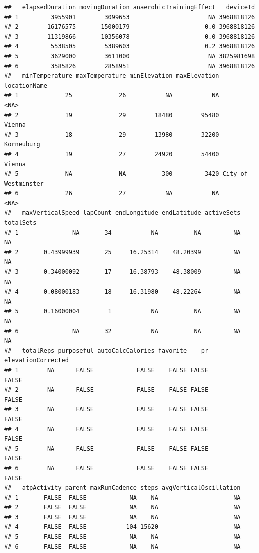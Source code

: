 \documentclass[
]{book}
\begin{document}
\begin{verbatim}
##   elapsedDuration movingDuration anaerobicTrainingEffect   deviceId
## 1         3955901        3099653                      NA 3968818126
## 2        16176575       15000179                     0.0 3968818126
## 3        11319866       10356078                     0.0 3968818126
## 4         5538505        5389603                     0.2 3968818126
## 5         3629000        3611000                      NA 3825981698
## 6         3585826        2858951                      NA 3968818126
##   minTemperature maxTemperature minElevation maxElevation        locationName
## 1             25             26           NA           NA                <NA>
## 2             19             29        18480        95480              Vienna
## 3             18             29        13980        32200          Korneuburg
## 4             19             27        24920        54400              Vienna
## 5             NA             NA          300         3420 City of Westminster
## 6             26             27           NA           NA                <NA>
##   maxVerticalSpeed lapCount endLongitude endLatitude activeSets totalSets
## 1               NA       34           NA          NA         NA        NA
## 2       0.43999939       25     16.25314    48.20399         NA        NA
## 3       0.34000092       17     16.38793    48.38009         NA        NA
## 4       0.08000183       18     16.31980    48.22264         NA        NA
## 5       0.16000004        1           NA          NA         NA        NA
## 6               NA       32           NA          NA         NA        NA
##   totalReps purposeful autoCalcCalories favorite    pr elevationCorrected
## 1        NA      FALSE            FALSE    FALSE FALSE              FALSE
## 2        NA      FALSE            FALSE    FALSE FALSE              FALSE
## 3        NA      FALSE            FALSE    FALSE FALSE              FALSE
## 4        NA      FALSE            FALSE    FALSE FALSE              FALSE
## 5        NA      FALSE            FALSE    FALSE FALSE              FALSE
## 6        NA      FALSE            FALSE    FALSE FALSE              FALSE
##   atpActivity parent maxRunCadence steps avgVerticalOscillation
## 1       FALSE  FALSE            NA    NA                     NA
## 2       FALSE  FALSE            NA    NA                     NA
## 3       FALSE  FALSE            NA    NA                     NA
## 4       FALSE  FALSE           104 15620                     NA
## 5       FALSE  FALSE            NA    NA                     NA
## 6       FALSE  FALSE            NA    NA                     NA

\end{verbatim}
\end{document}
